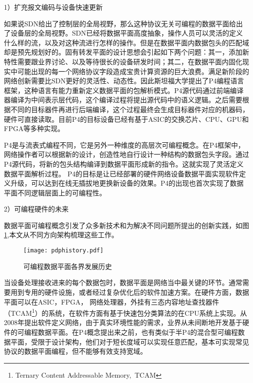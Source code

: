 

1）扩充报文编码与设备快速更新

如果说SDN给出了控制层的全局视野，那么这种协议无关可编程的数据平面给出了设备层的全局视野。SDN已经将数据平面高度抽象，操作人员可以灵活的定义什么样的流，以及对这种流进行怎样的操作。但是在数据平面内数据包头的匹配域却是预先规划好的。固有转发平面的设计思想会引起如下两个问题：其一，添加新特性需要跟业界讨论、以及等待很长的设备研发时间；其二，在数据平面内固化现实中可能出现的每一个网络协议字段造成宝贵计算资源的巨大浪费。满足新阶段的网络创新需要比SDN更好的灵活性、动态性。因此斯坦福大学提出了P4编程语言框架，这种语言有能力重新定义数据平面的包解析模式。P4源代码通过前端编译器编译为中间表示层代码，这个编译过程将提出源代码中的语义逻辑。之后需要根据不同的目标器件再进行后端编译，这个过程最终会生成目标器件对应的机器码，硬件可直接读取。目前P4的目标设备已经有基于ASIC的交换芯片、CPU、GPU和FPGA等多种实现。

P4是与流表式编程不同，它是另外一种维度的高层次可编程概念。在P4框架中，网络操作者可以根据新的设计，创造性地自行设计一种结构的数据包头字段。通过P4源代码，将新的包头结构编译到数据平面形成新的指令。这就实现了灵活定义数据平面解析过程。
P4的目标是让已经部署的硬件网络设备数据平面实现软件定义升级，可以达到在线无插拔地更换新设备的效果。P4的出现也首次实现了数据平面不同逻辑层面上的可编程性。

2）可编程硬件的未来

数据平面可编程概念引发了众多新技术和为解决不同问题所提出的创新实践，如图\ref{fig:pdphistory},本文从不同方向架构梳理这些工作。

\begin{figure}[!ht]
	\centering
	\texttt{[image: pdphistory.pdf]}
	\caption{可编程数据平面各界发展历史} \label{fig:pdphistory}
\end{figure}

当设备处理接收进来的每个数据包时，数据平面是网络当中最关键的环节。通常需要用到专用的硬件设施，或者经过复杂优化后的软件加速方案。在硬件方面，数据平面可以在ASIC，FPGA， 网络处理器，外挂有三态内容地址查找器件（TCAM\footnote{Ternary Content Addressable Memory,~TCAM}）的系统，在软件方面有基于快速包分类算法的在CPU系统上实现。从2008年提出软件定义网络，由于真实环境性能的需求，业界从未间断地开发基于硬件的可编程数据平面。在P4概念提出来之前，也有类似于半P4的混合型可编程数据平面，受限于设计架构，他们对于短长度域可以实现任意匹配，基本可实现常见协议的数据平面编程，但不能够有效支持宽域。

